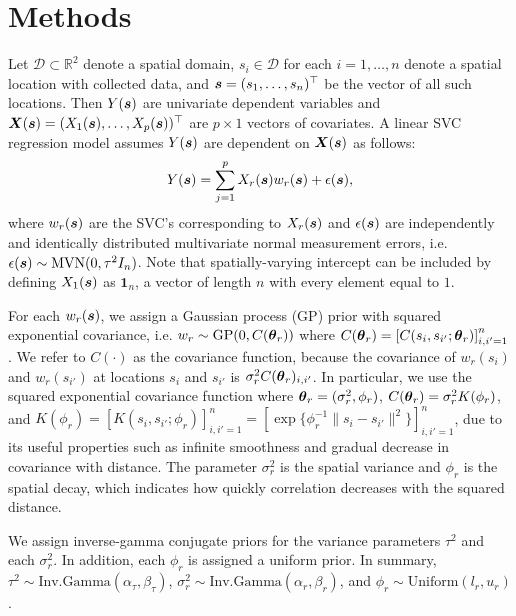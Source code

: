 \section{Methods}
\label{sec:methods}
Let $\mathcal{D} \subset \mathbb{R}^2$ denote a spatial domain, $s_i \in \mathcal{D}$ for each $i = 1, \dots, n$ denote a spatial location with collected data, and $\boldsymbol{s} = (s_1, \dots, s_n)^\top$ be the vector of all such locations. Then $Y(\boldsymbol{s})$ are univariate dependent variables and $\boldsymbol{X}(\boldsymbol{s}) = (X_1(\boldsymbol{s}), \dots, X_p(\boldsymbol{s}))^\top$ are $p \times 1$ vectors of covariates. A linear SVC regression model assumes $Y(\boldsymbol{s})$ are dependent on $\boldsymbol{X}(\boldsymbol{s})$ as follows:
\begin{align*}
    Y(\boldsymbol{s}) = \sum_{j=1}^p X_r(\boldsymbol{s})w_r(\boldsymbol{s}) + \epsilon(\boldsymbol{s}),
\end{align*}
where $w_r(\boldsymbol{s})$ are the SVC's corresponding to $X_r(\boldsymbol{s})$ and $\epsilon(\boldsymbol{s})$ are independently and identically distributed multivariate normal measurement errors, i.e. $\epsilon(\boldsymbol{s}) \sim \text{MVN}(0, \tau^2 I_n)$. Note that spatially-varying intercept can be included by defining $X_1(\boldsymbol{s})$ as $\mathbf{1}_n$, a vector of length $n$ with every element equal to $1$.

For each $w_r(\boldsymbol{s})$, we assign a Gaussian process (GP) prior with squared exponential covariance, i.e. $w_r \sim \text{GP}(0, C(\boldsymbol{\theta}_r))$ where $C(\boldsymbol{\theta}_r) = \left[C(s_i, s_{i'}; \boldsymbol{\theta}_r)\right]_{i, i' = 1}^n$. We refer to $C(\cdot)$ as the covariance function, because the covariance of $w_r(s_i)$ and $w_r(s_{i'})$ at locations $s_i$ and $s_{i'}$ is $\sigma_r^2 C(\boldsymbol{\theta}_r)_{i, i'}$. In particular, we use the squared exponential covariance function where $\boldsymbol{\theta}_r = (\sigma_r^2, \phi_r)$, $C(\boldsymbol{\theta}_r) = \sigma_r^2 K(\phi_r)$, and $K(\phi_r) = \left[ K(s_i, s_{i'}; \phi_r) \right]_{i, i' = 1}^n = \left[\exp\{\phi_r^{-1}\|s_i-s_{i'}\|^2\}\right]_{i, i' = 1}^n$,
due to its useful properties such as infinite smoothness and gradual decrease in covariance with distance. The parameter $\sigma_r^2$ is the spatial variance and $\phi_r$ is the spatial decay, which indicates how quickly correlation decreases with the squared distance.

We assign inverse-gamma conjugate priors for the variance parameters $\tau^2$ and each $\sigma_r^2$. In addition, each $\phi_r$ is assigned a uniform prior. In summary, $\tau^2 \sim \text{Inv.Gamma}(\alpha_\tau, \beta_\tau)$, $\sigma_r^2 \sim \text{Inv.Gamma}(\alpha_r, \beta_r)$, and $\phi_r \sim \text{Uniform}(l_r, u_r)$.

